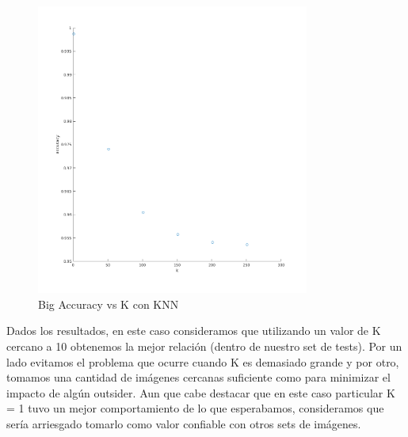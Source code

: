 \begin{figure}[H]
	\centering	\includegraphics[width=0.8\textwidth]{img/big_k_knn_accu.png}
	\caption{Big Accuracy vs K con KNN}
	\label{fig:Big Accuracy vs K con KNN}
\end{figure}

Dados los resultados, en este caso consideramos que utilizando un valor de K cercano a 10 obtenemos la mejor relación (dentro de nuestro set de tests).\newline
Por un lado evitamos el problema que ocurre cuando K es demasiado grande y por otro, tomamos una cantidad de imágenes cercanas suficiente como para minimizar el impacto de algún outsider. Aun que cabe destacar que en este caso particular K = 1 tuvo un mejor comportamiento de lo que esperabamos, consideramos que sería arriesgado tomarlo como valor confiable con otros sets de imágenes.


